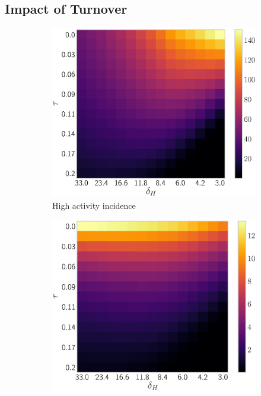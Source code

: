 \documentclass[10pt]{article}
\newlength{\figi}  \setlength{\figi}  {0.800\textwidth}
\newlength{\figii} \setlength{\figii} {0.490\textwidth}
\newlength{\figiii}\setlength{\figiii}{0.325\textwidth}
\numberwithin{equation}{section}
\begin{document}
\subsection{Impact of Turnover}\label{ss:rd-zeta}
\begin{figure}
  \centering
  \begin{subfigure}{\figiii}
    \includegraphics[width=\textwidth]{2d-incidence-high.eps}
    \caption{High activity incidence}
    \label{fig:2d-inc-high}
  \end{subfigure}
  \begin{subfigure}{\figiii}
    \includegraphics[width=\textwidth]{2d-incidence-low.eps}

\end{subfigure}
\end{figure}
\end{document}
